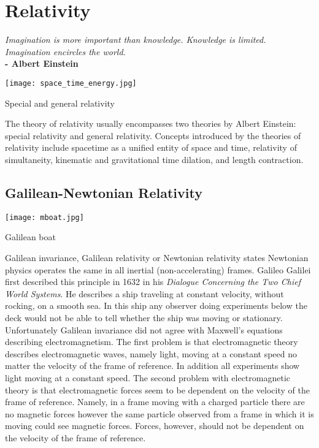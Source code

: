 \chapter{Relativity}

\textit{Imagination is more important than knowledge. Knowledge is limited. Imagination encircles the world.}\\
\noindent\textbf{-   Albert Einstein}

\vspace{0.5cm}

\begin{marginfigure}%
  \texttt{[image: space\_time\_energy.jpg]}
  \caption{Special and general relativity}
  \label{fig:marginfig}
\end{marginfigure}

The theory of relativity usually encompasses two theories by Albert Einstein: special relativity and general relativity.  Concepts introduced by the theories of relativity include spacetime as a unified entity of space and time, relativity of simultaneity, kinematic and gravitational time dilation, and length contraction.

\section{Galilean-Newtonian Relativity}
\begin{marginfigure}[0pt]
  \texttt{[image: mboat.jpg]}
  \caption{Galilean boat}
  \label{fig:marginfig}
\end{marginfigure}
Galilean invariance, Galilean relativity or Newtonian relativity states Newtonian physics operates the same in all inertial (non-accelerating) frames. Galileo Galilei first described this principle in 1632 in his \textit{Dialogue Concerning the Two Chief World Systems}.  He describes a ship traveling at constant velocity, without rocking, on a smooth sea.  In this ship any observer doing experiments below the deck would not be able to tell whether the ship was moving or stationary.\\
Unfortunately Galilean invariance did not agree with Maxwell's equations describing electromagnetism.  The first problem is that electromagnetic theory describes electromagnetic waves, namely light, moving at a constant speed no matter the velocity of the frame of reference.  In addition all experiments show light moving at a constant speed.  The second problem with electromagnetic theory is that electromagnetic forces seem to be dependent on the velocity of the frame of reference.  Namely, in a frame moving with a charged particle there are no magnetic forces however the same particle observed from a frame in which it is moving could see magnetic forces.  Forces, however, should not be dependent on the velocity of the frame of reference. 

